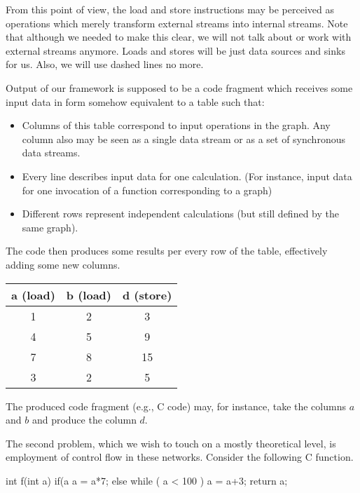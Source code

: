 From this point of view, the load and store instructions may be perceived as operations which merely transform external streams into internal streams. Note that although we needed to make this clear, we will not talk about or work with external streams anymore. Loads and stores will be just data sources and sinks for us. Also, we will use dashed lines no more.


Output of our framework is supposed to be a code fragment which receives some input data in form somehow equivalent to a table such that:
\begin{itemize}
  \item Columns of this table correspond to input operations in the graph. Any column also may be seen as a single data stream or as a set of synchronous data streams. 
  \item Every line describes input data for one calculation. (For instance, input data for one invocation of a function corresponding to a graph)
  \item Different rows represent independent calculations (but still defined by the same graph). 
\end{itemize}
The code then produces some results per every row of the table, effectively adding some new columns.

  \mybeginfig
\begin{center}
  \begin{tabular}{c|c||c}
    a (load)&b (load)&d (store)\\
  \hline
  1&2&3\\
  4&5&9\\
  7&8&15\\
  3&2&5\\
  \end{tabular}
\end{center}

The produced code fragment (e.g., C code) may, for instance, take the columns $a$ and $b$ and produce the column $d$. 


The second problem, which we wish to touch on a mostly theoretical level, is employment of control flow in these networks. Consider the following C function. 

\mybeginfig
\begin{code}
int f(int a)
{
  if(a %
    a = a*7;
  else
    while ( a < 100 )
      a = a+3;
  return a;
}
\end{code}

